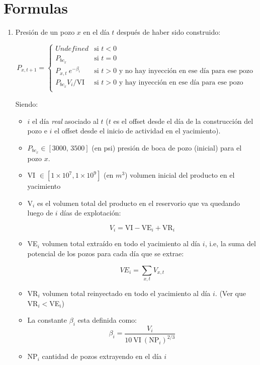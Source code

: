 \section{Formulas}

\begin{enumerate}
 \item Presi\'on de un pozo $x$ en el d\'ia $t$ despu\'es de haber sido construido:
 
  $$
    P_{x,{t+1}} = \left\{
    \begin{array}{cl}
    \textit{Undefined}	& \mbox{si } t < 0 \\
    P_{bc_x} 		& \mbox{si } t = 0 \\
    P_{x,t} \ e^{-\beta_i}	& \mbox{si } t > 0 \text{ y no hay inyecci\'on en ese d\'ia para ese pozo} \\
    P_{bc_x} V_i/\text{VI} & \mbox{si } t > 0 \text{ y hay inyecci\'on en ese d\'ia para ese pozo} \\
    \end{array}\right.
    $$

 Siendo:
 
 \begin{itemize}
  \item $i$ el d\'ia \textit{real} asociado al $t$ ($t$ es el offset desde el d\'ia de la construcci\'on del pozo e $i$ el offset desde el inicio de actividad en el yacimiento). 
  \item $P_{bc_x}\in[\text{3000, 3500}]$ (en psi) presi\'on de boca de pozo (inicial) para el pozo $x$.
  \item VI $\in[1\times 10^7, 1\times 10^9]$ (en $m^3$) volumen inicial del producto en el yacimiento
  \item V$_i$ es el volumen total del producto en el reservorio que va quedando luego de $i$ d\'ias de explotaci\'on:
  
  \begin{equation*}
    V_i = \text{VI} - \text{VE}_i + \text{VR}_i
  \end{equation*}

  
  \item VE$_i$ volumen total extra\'ido en todo el yacimiento al d\'ia $i$, i.e, la suma del potencial de los pozos para cada d\'ia que se extrae:
  
  \begin{equation*}
   VE_i = \sum_{x,t} V_{x,t}
  \end{equation*}

  
  \item VR$_i$ volumen total reinyectado en todo el yacimiento al d\'ia $i$. (Ver que VR$_i<$VE$_i$)
  \item La constante $\beta_i$ esta definida como:
  \begin{equation*}
   \beta_i = \frac{V_i}{10\ \text{VI}\ (\text{NP}_i)^{2/3}}
  \end{equation*}
  \item NP$_i$ cantidad de pozos extrayendo en el d\'ia $i$
 \end{itemize}


\end{enumerate}
